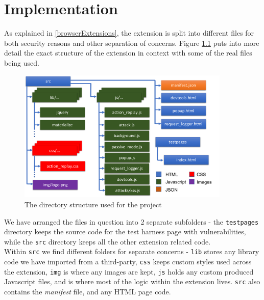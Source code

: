 \chapter{Implementation} \label{implementation}



As explained in \ref{browserExtensions}, the extension is split into different files for both security reasons and other separation of concerns.
Figure \ref{fig:project_structure} puts into more detail the exact structure of the extension in context with some of the real files being used.


\begin{figure}[h]
	\centering
	\includegraphics[width=0.9\textwidth]{images/project_structure.png}
	\caption{The directory structure used for the project}
	\label{fig:project_structure}
\end{figure}

We have arranged the files in question into 2 separate subfolders - the \texttt{testpages} directory keeps the source code for the test harness page with vulnerabilities, while the \texttt{src} directory keeps all the other extension related code. \\

Within \texttt{src} we find different folders for separate concerns - \texttt{lib} stores any library code we have imported from a third-party, \texttt{css} keeps custom styles used across the extension, \texttt{img} is where any images are kept, \texttt{js} holds any custom produced Javascript files, and is where most of the logic within the extension lives. \texttt{src} also contains the \textit{manifest} file, and any HTML page code. 

